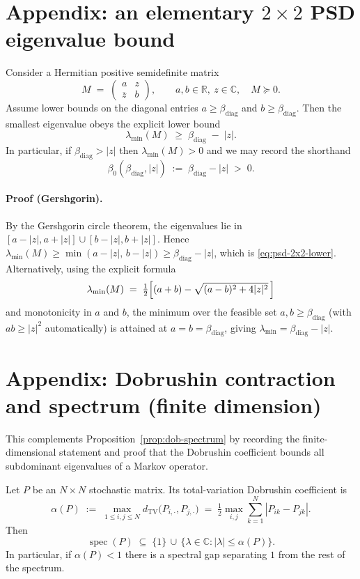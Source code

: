 \documentclass[11pt]{amsart}
\begin{document}
\section{Appendix: an elementary $2\times 2$ PSD eigenvalue bound}

Consider a Hermitian positive semidefinite matrix
\[
  M\;=\;\begin{pmatrix} a & z \\ \overline{z} & b \end{pmatrix},\qquad a,b\in\mathbb{R},\ z\in\mathbb{C},\quad M\succeq 0.
\]
Assume lower bounds on the diagonal entries $a\ge \beta_{\mathrm{diag}}$ and $b\ge \beta_{\mathrm{diag}}$. Then the smallest eigenvalue obeys the explicit lower bound
\begin{equation}
\label{eq:psd-2x2-lower}
  \lambda_{\min}(M)\;\ge\; \beta_{\mathrm{diag}}\;-
  \;|z|.
\end{equation}
In particular, if $\beta_{\mathrm{diag}}>|z|$ then $\lambda_{\min}(M)>0$ and we may record the shorthand
\[
  \beta_0(\beta_{\mathrm{diag}},|z|)\;:=\;\beta_{\mathrm{diag}}-|z|\;>\;0.
\]

\paragraph{Proof (Gershgorin).}
By the Gershgorin circle theorem, the eigenvalues lie in $[a-|z|,a+|z|]\cup[b-|z|,b+|z|]$. Hence $\lambda_{\min}(M)\ge \min(a-|z|,\,b-|z|)\ge \beta_{\mathrm{diag}}-|z|$, which is \eqref{eq:psd-2x2-lower}. Alternatively, using the explicit formula
\[
  \lambda_{\min}(M)\;=\;\tfrac12\Bigl[(a+b)-\sqrt{(a-b)^2+4|z|^2}\,\Bigr]
\]
and monotonicity in $a$ and $b$, the minimum over the feasible set $a,b\ge\beta_{\mathrm{diag}}$ (with $ab\ge |z|^2$ automatically) is attained at $a=b=\beta_{\mathrm{diag}}$, giving $\lambda_{\min}=\beta_{\mathrm{diag}}-|z|$.

\section{Appendix: Dobrushin contraction and spectrum (finite dimension)}

This complements Proposition~\ref{prop:dob-spectrum} by recording the finite-dimensional statement and proof that the Dobrushin coefficient bounds all subdominant eigenvalues of a Markov operator.

\begin{theorem}
Let $P$ be an $N\times N$ stochastic matrix. Its total-variation Dobrushin coefficient is
\[
  \alpha(P)\;:=\;\max_{1\le i,j\le N} d_{\mathrm{TV}}\bigl(P_{i,\cdot},P_{j,\cdot}\bigr)
  \;=\;\tfrac12\max_{i,j}\sum_{k=1}^N |P_{ik}-P_{jk}|.
\]
Then
\[
  \operatorname{spec}(P)\;\subseteq\;\{1\}\,\cup\,\{\lambda\in\mathbb{C}: |\lambda|\le \alpha(P)\}.
\]
In particular, if $\alpha(P)<1$ there is a spectral gap separating $1$ from the rest of the spectrum.
\end{theorem}
\end{document}
